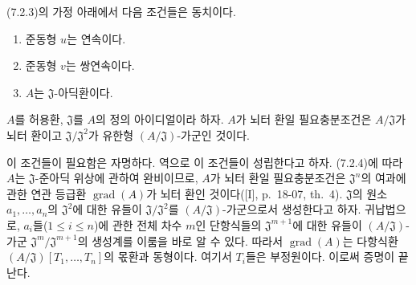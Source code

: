 \begin{corollary}[7.2.5]
\label{0.7.2.5-ko}
(7.2.3)의 가정 아래에서 다음 조건들은 동치이다.
\begin{enumerate}
  \item[$a)$] 준동형 $u$는 연속이다.


  \item[$b)$] 준동형 $v$는 쌍연속이다.
  \item[$c)$] $A$는 $\mathfrak J$-아딕환이다.
\end{enumerate}
\end{corollary}

\begin{corollary}[7.2.6]
\label{0.7.2.6-ko}
$A$를 허용환, $\mathfrak J$를 $A$의 정의 아이디얼이라 하자.
$A$가 뇌터 환일 필요충분조건은 $A/\mathfrak J$가 뇌터 환이고
$\mathfrak J/\mathfrak J^2$가 유한형
$(A/\mathfrak J)$-가군인 것이다.
\end{corollary}

이 조건들이 필요함은 자명하다. 역으로 이 조건들이 성립한다고 하자.
(7.2.4)에 따라 $A$는 $\mathfrak J$-준아딕 위상에 관하여
완비이므로, $A$가 뇌터 환일 필요충분조건은 $\mathfrak J^n$의
여과에 관한 연관 등급환 $\operatorname{grad}(A)$가 뇌터 환인
것이다([I], p.~18-07, th.~4). $\mathfrak J$의 원소
$a_1,\ldots,a_n$의 $\mathfrak J^2$에 대한 유들이
$\mathfrak J/\mathfrak J^2$를 $(A/\mathfrak J)$-가군으로서
생성한다고 하자. 귀납법으로, $a_i$들($1\leq i\leq n$)에 관한
전체 차수 $m$인 단항식들의 $\mathfrak J^{m+1}$에 대한 유들이
$(A/\mathfrak J)$-가군
$\mathfrak J^m/\mathfrak J^{m+1}$의 생성계를 이룸을 바로 알 수
있다. 따라서 $\operatorname{grad}(A)$는 다항식환
$(A/\mathfrak J)[T_1,\ldots,T_n]$의 몫환과 동형이다. 여기서
$T_i$들은 부정원이다. 이로써 증명이 끝난다.

